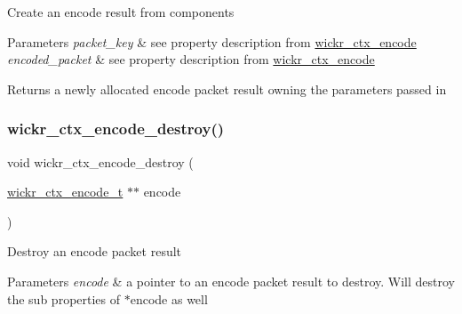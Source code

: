 Create an encode result from components


\begin{DoxyParams}{Parameters}
{\em packet\+\_\+key} & see property description from \textquotesingle{}\hyperlink{structwickr__ctx__encode}{wickr\+\_\+ctx\+\_\+encode}\textquotesingle{} \\
\hline
{\em encoded\+\_\+packet} & see property description from \textquotesingle{}\hyperlink{structwickr__ctx__encode}{wickr\+\_\+ctx\+\_\+encode}\textquotesingle{} \\
\hline
\end{DoxyParams}
\begin{DoxyReturn}{Returns}
a newly allocated encode packet result owning the parameters passed in 
\end{DoxyReturn}
\mbox{\label{group__wickr__ctx_ga9ed3f7c0f4d672a2ac562b279e2da4e1}} 
\subsubsection{\texorpdfstring{wickr\+\_\+ctx\+\_\+encode\+\_\+destroy()}{wickr\_ctx\_encode\_destroy()}}
{\footnotesize\ttfamily void wickr\+\_\+ctx\+\_\+encode\+\_\+destroy (\begin{DoxyParamCaption}\item[{\hyperlink{structwickr__ctx__encode}{wickr\+\_\+ctx\+\_\+encode\+\_\+t} $\ast$$\ast$}]{encode }\end{DoxyParamCaption})}

Destroy an encode packet result


\begin{DoxyParams}{Parameters}
{\em encode} & a pointer to an encode packet result to destroy. Will destroy the sub properties of \textquotesingle{}$\ast$encode\textquotesingle{} as well \\
\hline
\end{DoxyParams}
\mbox{\label{group__wickr__ctx_ga3766720fd6654fad791a26cd2c1161b7}} 
